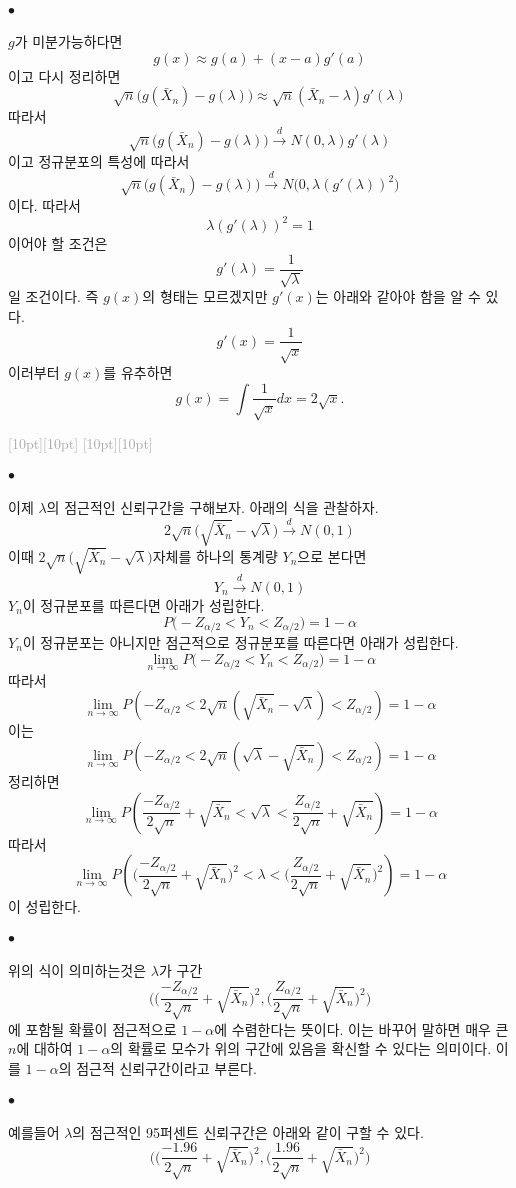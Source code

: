 \documentclass[12pt,oneside,english]{book}
\newcommand{\rdash}{\noindent \textcolor{darkgray}{ \raisebox{-1.9pt}[10pt][10pt]{\leafright} \hrulefill \raisebox{-1.9pt}[10pt][10pt]{\leafright \decofourleft \decothreeleft  \aldineright \decotwo \floweroneleft \decoone}}}
\def\ck{\paragraph{\Large$\bullet$}\Large}
\begin{document}
\ck $g$가 미분가능하다면 
\[
g(x)\approx g(a)+(x-a)g'(a)
\]
이고 다시 정리하면 
\[
\sqrt{n}\big(g(\bar{X}_n)-g(\lambda)\big) \approx \sqrt{n}(\bar{X}_n-\lambda)g'(\lambda)
\]
따라서 
\[
\sqrt{n}\big(g(\bar{X}_n)-g(\lambda)\big) \overset{d}{\to} N(0,\lambda) g'(\lambda)
\]
이고 정규분포의 특성에 따라서 
\[
\sqrt{n}\big(g(\bar{X}_n)-g(\lambda)\big) \overset{d}{\to} N\big(0,\lambda (g'(\lambda))^2\big)
\]
이다. 따라서 
\[
\lambda (g'(\lambda))^2 =1 
\]
이어야 할 조건은 
\[
g'(\lambda)=\frac{1}{\sqrt\lambda}
\]
일 조건이다. 즉 $g(x)$의 형태는 모르겠지만 $g'(x)$는 아래와 같아야 함을 알 수 있다. 
\[
g'(x)=\frac{1}{\sqrt x}
\]
이러부터 $g(x)$를 유추하면
\[
g(x)=\int\frac{1}{\sqrt x} dx = 2\sqrt{x}.
\]

\rdash 

\ck 이제 $\lambda$의 점근적인 신뢰구간을 구해보자. 아래의 식을 관찰하자. 
\[
2\sqrt{n}\big(\sqrt{\bar{X}_n}-\sqrt{\lambda}\big) \overset{d}{\to} N(0,1)
\]
이때 $2\sqrt{n}\big(\sqrt{\bar{X}_n}-\sqrt{\lambda}\big)$자체를 하나의 통계량 $Y_n$으로 본다면 
\[
Y_n \overset{d}{\to} N(0,1)
\]
$Y_n$이 정규분포를 따른다면 아래가 성립한다. 
\[
P\big(-Z_{\alpha/2}<Y_n<Z_{\alpha/2}\big)=1-\alpha
\]
$Y_n$이 정규분포는 아니지만 점근적으로 정규분포를 따른다면 아래가 성립한다. 
\[
\lim_{n\to\infty}P\big(-Z_{\alpha/2}<Y_n<Z_{\alpha/2}\big)=1-\alpha
\]
따라서 
\[
\lim_{n\to\infty}P\left(-Z_{\alpha/2}<2\sqrt{n}(\sqrt{\bar{X}_n}-\sqrt{\lambda})<Z_{\alpha/2}\right)=1-\alpha
\]
이는 
\[
\lim_{n\to\infty}P\left(-Z_{\alpha/2}<2\sqrt{n}(\sqrt{\lambda}-\sqrt{\bar{X}_n})<Z_{\alpha/2}\right)=1-\alpha
\]
정리하면 
\[
\lim_{n\to\infty}P\left(\frac{-Z_{\alpha/2}}{2\sqrt{n}}+\sqrt{\bar{X}_n}<\sqrt{\lambda}<\frac{Z_{\alpha/2}}{2\sqrt{n}}+\sqrt{\bar{X}_n}\right)=1-\alpha
\]
따라서 
\[
\lim_{n\to\infty}P\left(\Big(\frac{-Z_{\alpha/2}}{2\sqrt{n}}+\sqrt{\bar{X}_n}\Big)^2<\lambda<\Big(\frac{Z_{\alpha/2}}{2\sqrt{n}}+\sqrt{\bar{X}_n}\Big)^2\right)=1-\alpha
\]
이 성립한다.

\ck 위의 식이 의미하는것은 $\lambda$가 구간 
\[
\Bigg(\Big(\frac{-Z_{\alpha/2}}{2\sqrt{n}}+\sqrt{\bar{X}_n}\Big)^2,\Big(\frac{Z_{\alpha/2}}{2\sqrt{n}}+\sqrt{\bar{X}_n}\Big)^2 \Bigg)
\]
에 포함될 확률이 점근적으로 $1-\alpha$에 수렴한다는 뜻이다. 이는 바꾸어 말하면 매우 큰 $n$에 대하여 $1-\alpha$의 확률로 모수가 위의 구간에 있음을 확신할 수 있다는 의미이다. 이를 $1-\alpha$의 점근적 신뢰구간이라고 부른다. 

\ck 예를들어 $\lambda$의 점근적인 95퍼센트 신뢰구간은 아래와 같이 구할 수 있다. 
\[
\Bigg(\Big(\frac{-1.96}{2\sqrt{n}}+\sqrt{\bar{X}_n}\Big)^2,\Big(\frac{1.96}{2\sqrt{n}}+\sqrt{\bar{X}_n}\Big)^2 \Bigg)
\]
\end{document}
